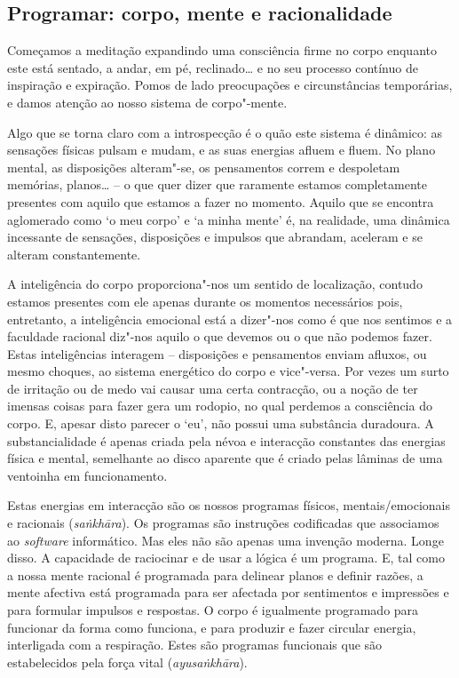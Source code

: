 \subsection{Programar: corpo, mente e racionalidade}

Começamos a meditação expandindo uma consciência firme no corpo enquanto este
está sentado, a andar, em pé, reclinado\ldots{} e no seu processo contínuo de
inspiração e expiração. Pomos de lado preocupações e circunstâncias temporárias,
e damos atenção ao nosso sistema de corpo"-mente.

Algo que se torna claro com a introspecção é o quão este sistema é dinâmico: as
sensações físicas pulsam e mudam, e as suas energias afluem e fluem. No plano
mental, as disposições alteram"-se, os pensamentos correm e despoletam memórias,
planos\ldots{} -- o que quer dizer que raramente estamos completamente presentes com
aquilo que estamos a fazer no momento. Aquilo que se encontra aglomerado como `o
meu corpo' e `a minha mente' é, na realidade, uma dinâmica incessante de
sensações, disposições e impulsos que abrandam, aceleram e se alteram
constantemente. 

A inteligência do corpo proporciona"-nos um sentido de
localização, contudo estamos presentes com ele apenas durante os momentos
necessários pois, entretanto, a inteligência emocional está a dizer"-nos como é
que nos sentimos e a faculdade racional diz"-nos aquilo o que devemos ou o que
não podemos fazer. Estas inteligências interagem -- disposições e pensamentos
enviam afluxos, ou mesmo choques, ao sistema energético do corpo e vice"-versa.
Por vezes um surto de irritação ou de medo vai causar uma certa contracção, ou a
noção de ter imensas coisas para fazer gera um rodopio, no qual perdemos a
consciência do corpo. E, apesar disto parecer o `eu', não possui uma substância
duradoura. A substancialidade é apenas criada pela névoa e interacção constantes
das energias física e mental, semelhante ao disco aparente que é criado pelas
lâminas de uma ventoinha em funcionamento.

Estas energias em interacção são os nossos programas físicos, mentais/emocionais
e racionais (\emph{saṅkhāra}). Os programas são instruções codificadas que
associamos ao \emph{software} informático. Mas eles não são apenas uma invenção
moderna. Longe disso. A capacidade de raciocinar e de usar a lógica é um
programa. E, tal como a nossa mente racional é programada para delinear planos e
definir razões, a mente afectiva está programada para ser afectada por
sentimentos e impressões e para formular impulsos e respostas. O corpo é
igualmente programado para funcionar da forma como funciona, e para produzir e
fazer circular energia, interligada com a respiração. Estes são programas
funcionais que são estabelecidos pela força vital (\emph{ayusaṅkhāra}).

